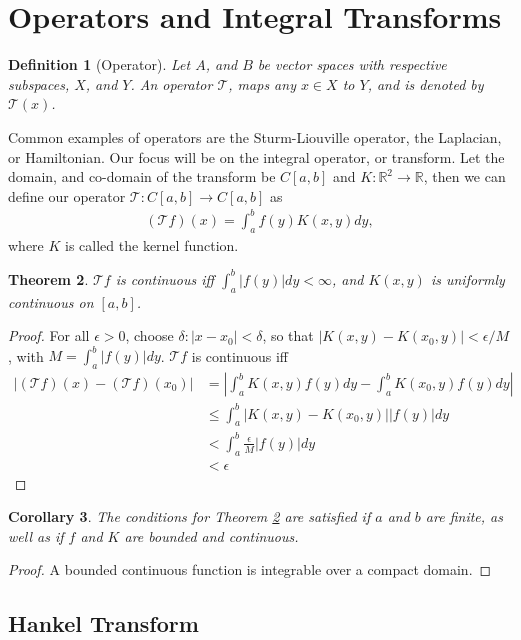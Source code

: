 \documentclass[10pt]{article}
\newtheorem{theorem}{Theorem}[section]
\newtheorem{definition}[theorem]{Definition}
\newtheorem{corollary}[theorem]{Corollary}
\begin{document}
\section{Operators and Integral Transforms}
\begin{definition}[Operator]
\label{def:operator}
Let $A$, and $B$ be vector spaces with respective subspaces, $X$, and $Y$. An operator $\mathcal{T}$, maps any $x \in X$ to $Y$, and is denoted by $\mathcal{T}(x)$.
\end{definition}
Common examples of operators are the Sturm-Liouville operator, the Laplacian, or Hamiltonian. Our focus will be on the integral operator, or transform. Let the domain, and co-domain of the transform be $C[a,b]$ and $K: \mathbb{R}^2 \rightarrow \mathbb{R}$, then we can define our operator $\mathcal{T}:C[a,b] \rightarrow C[a,b]$ as
\begin{align*}
(\mathcal{T}f)(x) = \int_a^b f(y) K(x,y)dy,
\end{align*}
where $K$ is called the kernel function.

\begin{theorem}
\label{thm:continuity}
$\mathcal{T}f$ is continuous iff $\int_a^b |f(y)| dy < \infty$, and $K(x,y)$ is uniformly continuous on $[a,b]$.
\end{theorem}
\begin{proof}
For all $\epsilon > 0$, choose $\delta : |x - x_0| < \delta$, so that $|K(x,y) - K(x_0,y)| < \epsilon/M$, with $M = \int_a^b |f(y)| dy$. $\mathcal{T}f$ is continuous iff
\begin{align*}
|(\mathcal{T}f)(x) - (\mathcal{T}f)(x_0)| &= \left| \int_a^b K(x,y)f(y) dy - \int_a^b K(x_0,y)f(y) dy \right| \\
&\leq \int_a^b |K(x,y) - K(x_0,y)||f(y)| dy \\
&< \int_a^b \frac{\epsilon}{M} |f(y)| dy \\
&< \epsilon
\end{align*}
\end{proof}

\begin{corollary}
The conditions for Theorem \ref{thm:continuity} are satisfied if $a$ and $b$ are finite, as well as if $f$ and $K$ are bounded and continuous.
\end{corollary}
\begin{proof}
A bounded continuous function is integrable over a compact domain.
\end{proof}

\subsection{Hankel Transform}
\end{document}
